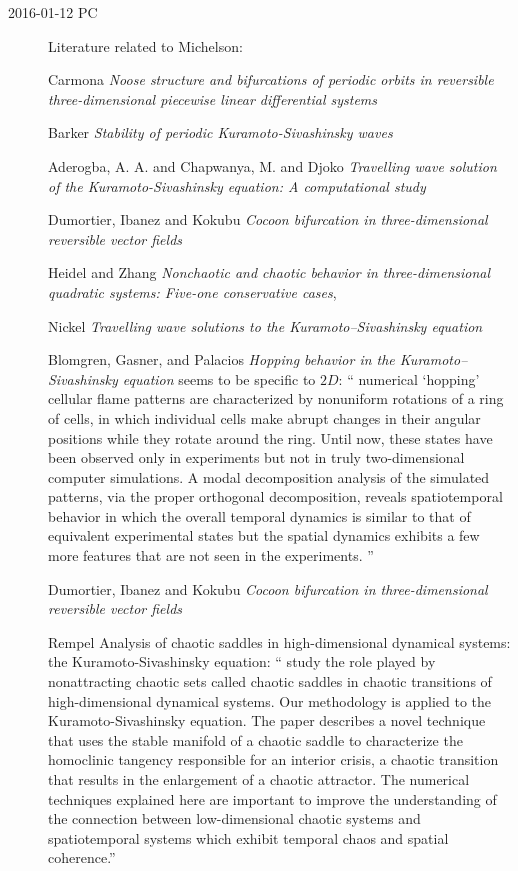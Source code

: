 \begin{description}
\item[2016-01-12 PC]  Literature
related to Michelson:

Carmona \etal{}
{\em Noose structure and bifurcations of periodic orbits in reversible
three-dimensional piecewise linear differential systems}

Barker \etal{}
{\em Stability of periodic { Kuramoto-Sivashinsky} waves}

Aderogba, A. A. and Chapwanya, M. and Djoko
{\em Travelling wave solution of the {Kuramoto-Sivashinsky} equation: A
computational study}


Dumortier,  Ibanez  and Kokubu
{\em Cocoon bifurcation in three-dimensional reversible vector fields}

Heidel and Zhang
{\em Nonchaotic and chaotic behavior in three-dimensional quadratic systems:
{Five}-one conservative cases},

Nickel
{\em Travelling wave solutions to the {Kuramoto–Sivashinsky} equation }

Blomgren, Gasner, and Palacios
{\em Hopping behavior in the Kuramoto–Sivashinsky equation}
seems to be specific to $2D$: `` numerical `hopping' cellular flame
patterns are characterized by nonuniform rotations of a ring of cells, in
which individual cells make abrupt changes in their angular positions
while they rotate around the ring. Until now, these states have been
observed only in experiments but not in truly two-dimensional computer
simulations. A modal decomposition analysis of the simulated patterns,
via the proper orthogonal decomposition, reveals spatiotemporal behavior
in which the overall temporal dynamics is similar to that of equivalent
experimental states but the spatial dynamics exhibits a few more features
that are not seen in the experiments.
''


Dumortier,  Ibanez  and Kokubu
{\em Cocoon bifurcation in three-dimensional reversible vector fields}

Rempel \etal{}
{Analysis of chaotic saddles in high-dimensional dynamical systems: the
{Kuramoto-Sivashinsky} equation}: ``
study the role played by nonattracting chaotic sets called chaotic
saddles in chaotic transitions of high-dimensional dynamical systems. Our
methodology is applied to the Kuramoto-Sivashinsky equation. The paper
describes a novel technique that uses the stable manifold of a chaotic
saddle to characterize the homoclinic tangency responsible for an
interior crisis, a chaotic transition that results in the enlargement of
a chaotic attractor. The numerical techniques explained here are
important to improve the understanding of the connection between
low-dimensional chaotic systems and spatiotemporal systems which exhibit
temporal chaos and spatial coherence.''


\end{description}
